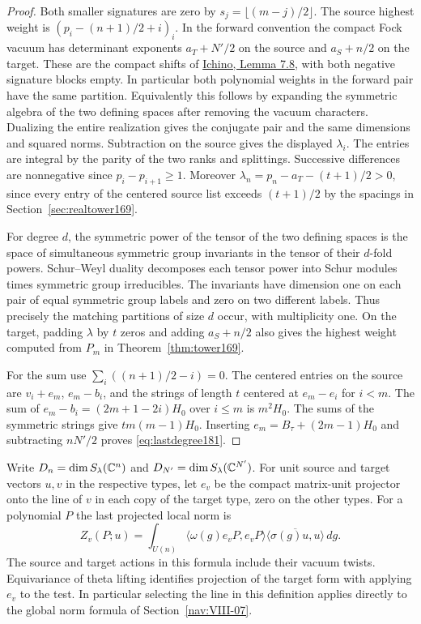 \documentclass[a4paper,11pt]{article}
\theoremstyle{definition}
\theoremstyle{remark}
\numberwithin{equation}{section}
\begin{document}
\begin{proof}
Both smaller signatures are zero by
\(s_j=\lfloor(m-j)/2\rfloor\). The source highest weight is
\((p_i-(n+1)/2+i)_i\). In the forward convention the compact
Fock vacuum has determinant exponents \(a_T+N'/2\) on the
source and \(a_S+n/2\) on the target. These are the compact
shifts of \href{https://arxiv.org/pdf/2002.09148}{Ichino,
Lemma 7.8}, with both negative signature blocks empty.
In particular both polynomial weights in the forward
pair have the same partition. Equivalently this follows
by expanding the symmetric algebra of the two defining
spaces after removing the vacuum characters. Dualizing the
entire realization gives the conjugate pair and the same
dimensions and squared norms. Subtraction on the source
gives the displayed \(\lambda_i\). The entries are integral
by the parity of the two ranks and splittings. Successive
differences are nonnegative since \(p_i-p_{i+1}\ge1\).
Moreover
\(\lambda_n=p_n-a_T-(t+1)/2>0\), since every entry of the
centered source list exceeds \((t+1)/2\) by the spacings in
Section~\ref{sec:realtower169}.

For degree \(d\), the symmetric power of the tensor of the
two defining spaces is the space of simultaneous symmetric
group invariants in the tensor of their \(d\)-fold powers.
Schur--Weyl duality decomposes each tensor power into
Schur modules times symmetric group irreducibles. The
invariants have dimension one on each pair of equal
symmetric group labels and zero on two different labels.
Thus precisely the matching partitions of size \(d\)
occur, with multiplicity one. On the target, padding \(\lambda\)
by \(t\) zeros and adding \(a_S+n/2\) also gives the highest
weight computed from \(P_m\) in Theorem~\ref{thm:tower169}.

For the sum use \(\sum_i ((n+1)/2-i)=0\). The centered
entries on the source are \(v_i+e_m\), \(e_m-b_i\), and the
strings of length \(t\) centered at \(e_m-e_i\) for \(i<m\).
The sum of \(e_m-b_i=(2m+1-2i)H_0\) over \(i\le m\) is
\(m^2H_0\). The sums of the symmetric strings give
\(tm(m-1)H_0\). Inserting \(e_m=B_\tau+(2m-1)H_0\) and
subtracting \(nN'/2\) proves \eqref{eq:lastdegree181}.
\end{proof}

Write \(D_n=\dim S_\lambda(\mathbb C^n)\) and
\(D_{N'}=\dim S_\lambda(\mathbb C^{N'})\). For unit source
and target vectors \(u,v\) in the respective types, let
\(e_v\) be the compact matrix-unit projector onto the line
of \(v\) in each copy of the target type, zero on the other
types. For a polynomial \(P\) the last projected local norm is
\[
 Z_v(P;u)=\int_{U(n)}
     \langle\omega(g)e_v P,e_vP\rangle
                \overline{\langle\sigma(g)u,u\rangle}\,dg.
\]
The source and target actions in this formula include their
vacuum twists. Equivariance of theta lifting identifies
projection of the target form with applying \(e_v\) to the
test. In particular selecting the line in this definition
applies directly to the global norm formula of Section~\ref{nav:VIII-07}.
\end{document}
